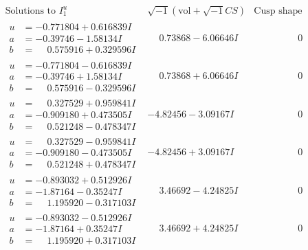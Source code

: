 \documentclass[1p]{elsarticle_modified}
\theoremstyle{definition}
\newcommand{\I}{\sqrt{-1}}
\begin{document}
$$\begin{array}{c|c|c}  
\text{Solutions to }I^u_{1}& \I (\text{vol} + \sqrt{-1}CS) & \text{Cusp shape}\\
 \hline 
\begin{aligned}
u &= -0.771804 + 0.616839 I \\
a &= -0.39746 - 1.58134 I \\
b &= \phantom{-}0.575916 + 0.329596 I\end{aligned}
 & \phantom{-}0.73868 - 6.06646 I & \phantom{-0.000000 } 0 \\ \hline\begin{aligned}
u &= -0.771804 - 0.616839 I \\
a &= -0.39746 + 1.58134 I \\
b &= \phantom{-}0.575916 - 0.329596 I\end{aligned}
 & \phantom{-}0.73868 + 6.06646 I & \phantom{-0.000000 } 0 \\ \hline\begin{aligned}
u &= \phantom{-}0.327529 + 0.959841 I \\
a &= -0.909180 + 0.473505 I \\
b &= \phantom{-}0.521248 - 0.478347 I\end{aligned}
 & -4.82456 - 3.09167 I & \phantom{-0.000000 } 0 \\ \hline\begin{aligned}
u &= \phantom{-}0.327529 - 0.959841 I \\
a &= -0.909180 - 0.473505 I \\
b &= \phantom{-}0.521248 + 0.478347 I\end{aligned}
 & -4.82456 + 3.09167 I & \phantom{-0.000000 } 0 \\ \hline\begin{aligned}
u &= -0.893032 + 0.512926 I \\
a &= -1.87164 - 0.35247 I \\
b &= \phantom{-}1.195920 - 0.317103 I\end{aligned}
 & \phantom{-}3.46692 - 4.24825 I & \phantom{-0.000000 } 0 \\ \hline\begin{aligned}
u &= -0.893032 - 0.512926 I \\
a &= -1.87164 + 0.35247 I \\
b &= \phantom{-}1.195920 + 0.317103 I\end{aligned}
 & \phantom{-}3.46692 + 4.24825 I & \phantom{-0.000000 } 0 \\ \hline\begin{aligned}

\end{aligned}
\end{array}$$
\end{document}
